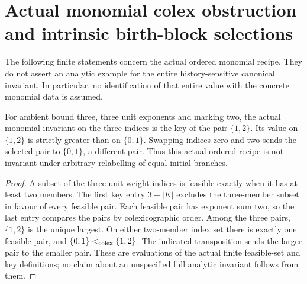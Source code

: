 \section{Actual monomial colex obstruction and intrinsic birth-block selections}
\label{sec:hironaka-monomial-birth-block-obstruction}

The following finite statements concern the actual ordered monomial
recipe. They do not assert an analytic example for the entire
history-sensitive canonical invariant. In particular, no identification
of that entire value with the concrete monomial data is assumed.

\begin{theorem}
\label{hir:actual-monomial-three-branch-colex-permutation-obstruction}
For ambient bound three, three unit exponents and marking two, the
actual monomial invariant on the three indices is the key of the pair
$\{1,2\}$. Its value on $\{1,2\}$ is strictly greater than on
$\{0,1\}$. Swapping indices zero and two sends the selected pair to
$\{0,1\}$, a different pair. Thus this actual ordered recipe is not
invariant under arbitrary relabelling of equal initial branches.
\leanok
{}
\end{theorem}
\begin{proof}
A subset of the three unit-weight indices is feasible exactly when it
has at least two members. The first key entry $3-|K|$ excludes the
three-member subset in favour of every feasible pair. Each feasible
pair has exponent sum two, so the last entry compares the pairs by
colexicographic order. Among the three pairs, $\{1,2\}$ is the unique
largest. On either two-member index set there is exactly one feasible
pair, and $\{0,1\}<_{\rm colex}\{1,2\}$. The indicated transposition
sends the larger pair to the smaller pair. These are evaluations of
the actual finite feasible-set and key definitions; no claim about
an unspecified full analytic invariant follows from them.
\end{proof}


